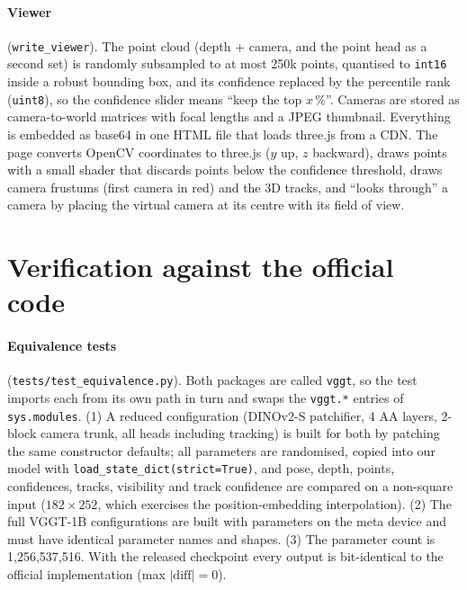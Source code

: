 \documentclass[11pt,a4paper]{article}
\newcommand{\src}[1]{\texttt{\small #1}}
\begin{document}
\paragraph{Viewer} (\texttt{write\_viewer}). The point cloud (depth + camera, and the point head as a second set) is randomly
subsampled to at most 250k points, quantised to \texttt{int16} inside a robust bounding box, and its confidence replaced by
the percentile rank (\texttt{uint8}), so the confidence slider means ``keep the top $x\,\%$''. Cameras are stored as
camera-to-world matrices with focal lengths and a JPEG thumbnail. Everything is embedded as base64 in one HTML file that loads
three.js from a CDN. The page converts OpenCV coordinates to three.js ($y$ up, $z$ backward), draws points with a small shader
that discards points below the confidence threshold, draws camera frustums (first camera in red) and the 3D tracks, and
``looks through'' a camera by placing the virtual camera at its centre with its field of view.

\section{Verification against the official code}

\paragraph{Equivalence tests} (\src{tests/test\_equivalence.py}). Both packages are called \texttt{vggt}, so the test imports
each from its own path in turn and swaps the \texttt{vggt.*} entries of \texttt{sys.modules}. (1) A reduced configuration
(DINOv2-S patchifier, 4 AA layers, 2-block camera trunk, all heads including tracking) is built for both by patching the same
constructor defaults; all parameters are randomised, copied into our model with \texttt{load\_state\_dict(strict=True)}, and
pose, depth, points, confidences, tracks, visibility and track confidence are compared on a non-square input
($182\times252$, which exercises the position-embedding interpolation). (2) The full VGGT-1B configurations are built with
parameters on the meta device and must have identical parameter names and shapes. (3) The parameter count is
1{,}256{,}537{,}516. With the released checkpoint every output is bit-identical to the official implementation (max
$|\mathrm{diff}| = 0$).
\end{document}
